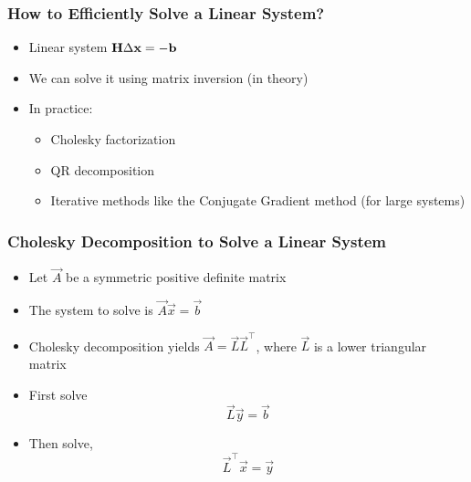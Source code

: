 \begin{frame}
    \frametitle{How to Efficiently Solve a Linear System?}
    \begin{itemize}
        \item Linear system $\boldsymbol{\mathbf{H}} \Delta \boldsymbol{\mathbf{x}} = -\boldsymbol{\mathbf{b}}$
        \item We can solve it using matrix inversion (in theory)
        \item In practice:
        \begin{itemize}
            \item Cholesky factorization
            \item QR decomposition
            \item Iterative methods like the Conjugate Gradient method (for large systems)
        \end{itemize}
        
    \end{itemize}
    
\end{frame}

\begin{frame}
    \frametitle{Cholesky Decomposition to Solve a Linear System}
    
    \begin{itemize}
        \item Let $\vec{A}$ be a symmetric positive definite matrix
        \item The system to solve is $\vec{A} \vec{x} = \vec{b}$
        \item Cholesky decomposition yields $\vec{A} = \vec{L} \vec{L}^{\top}$, where $\vec{L}$ is a lower triangular matrix
        \item<2> First solve
        \begin{equation*}
            \vec{L} \vec{y} = \vec{b}
        \end{equation*}
        \item<2> Then solve,
        \begin{equation*}
            \vec{L}^{\top} \vec{x} = \vec{y}
        \end{equation*}
    
    \end{itemize}
    
\end{frame}

